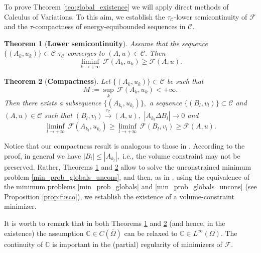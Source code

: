 \documentclass[reqno]{amsart}
\numberwithin{equation}{section}
\theoremstyle{plain}
\newtheorem{theorem}{Theorem}[section]
\theoremstyle{definition}
\newcommand{\C}{\mathbb{C}}
\newcommand{\cF}{\mathcal{F}}
\newcommand{\cl}[1]{\overline{#1}}
\newcommand{\admissible}{\mathcal{C}}
\begin{document}
To prove Theorem \ref{teo:global_existence} we will apply direct methods of Calculus of Variations. To this aim, we establish the $\tau_\admissible$-lower semicontinuity of $\cF$ and the $\tau$-compactness of energy-equibounded sequences in $\admissible.$

\begin{theorem}[\textbf{Lower semicontinuity}]\label{teo:lower_semicontinuity}
%
Assume that the sequence $\{(A_k,u_k)\}\subset\admissible$ $\tau_\admissible$-converges to $(A,u)\in\admissible.$ Then 
\begin{equation}\label{eq:lsc_functional}
\liminf\limits_{k\to+\infty}\,\cF(A_k,u_k) \ge \cF(A,u). 
\end{equation}
%
\end{theorem}


\begin{theorem}[\textbf{Compactness}]\label{teo:compactness}
Let $\{(A_k,u_k)\}\subset  \admissible$ be such that
$$
M:=\sup_k\,\cF(A_k,u_k)<+\infty.
$$
Then there exists a subsequence $\{(A_{k_l},u_{k_l})\},$ a sequence $\{(B_l,v_l)\}\subset \admissible$ and $(A,u)\in\admissible$ such that $(B_l,v_l)\overset{\tau_\admissible}{\to} (A,u),$ $|A_{k_l}\Delta B_l|\to0$ and 
\begin{equation*}%
\liminf\limits_{l\to+\infty}\, \cF(A_{k_l},u_{k_l}) \ge \liminf\limits_{l\to+\infty}\, \cF(B_l,v_l) \ge \cF(A,u).  
\end{equation*}
%
\end{theorem}

\noindent
Notice that our compactness result is analogous to those in \cite{FFLM:2007,HP:2020_arma}. According to the proof, in general we have $|B_l|\le |A_{k_l}|,$ i.e., the volume constraint may not be preserved. Rather, Theorems \ref{teo:lower_semicontinuity} and \ref{teo:compactness} allow to solve the unconstrained minimum problem \eqref{min_prob_globals_uncons}, and then, as in \cite[Theorem 1]{EF:2011}, using the equivalence of the minimum problems \eqref{min_prob_globals} and \eqref{min_prob_globals_uncons} (see Proposition \ref{prop:fusco}), we establish the existence of a volume-constraint minimizer. 


It is worth to remark that in both Theorems \ref{teo:lower_semicontinuity} and \ref{teo:compactness} (and hence, in the existence) the assumption $\C\in C(\cl{\Omega})$ can be relaxed to $\C\in L^\infty(\Omega)$. The continuity of $\C$ is important in the (partial) regularity of minimizers of $\cF$.
\end{document}
